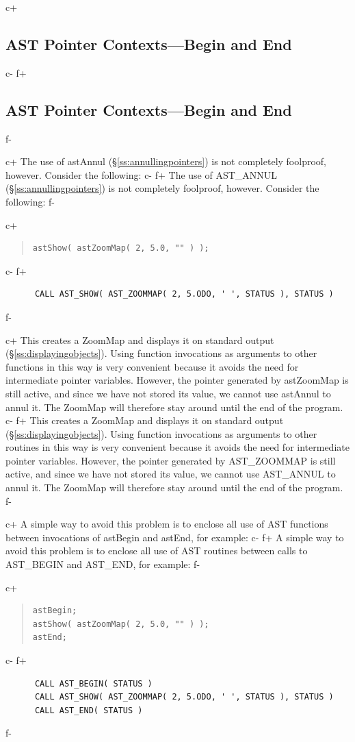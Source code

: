 \documentclass[twoside,11pt]{article}
\newcommand{\secref}[1]{\S\ref{#1}}
\newcommand{\secref}[1]{\ref{#1}}
\begin{document}
c+
\subsection{\label{ss:contexts}AST Pointer Contexts---Begin and End}
c-
f+
\subsection{\label{ss:contexts}AST Pointer Contexts---Begin and End}
f-

c+
The use of astAnnul (\secref{ss:annullingpointers}) is not completely
foolproof, however. Consider the following:
c-
f+
The use of AST\_ANNUL (\secref{ss:annullingpointers}) is not completely
foolproof, however. Consider the following:
f-

c+
\begin{quote}
\small
\begin{verbatim}
astShow( astZoomMap( 2, 5.0, "" ) );
\end{verbatim}
\normalsize
\end{quote}
c-
f+
\small
\begin{verbatim}
      CALL AST_SHOW( AST_ZOOMMAP( 2, 5.ODO, ' ', STATUS ), STATUS )
\end{verbatim}
\normalsize
f-

c+
This creates a ZoomMap and displays it on standard output
(\secref{ss:displayingobjects}). Using function invocations as
arguments to other functions in this way is very convenient because it
avoids the need for intermediate pointer variables. However, the
pointer generated by astZoomMap is still active, and since we have not
stored its value, we cannot use astAnnul to annul it. The ZoomMap will
therefore stay around until the end of the program.
c-
f+
This creates a ZoomMap and displays it on standard output
(\secref{ss:displayingobjects}). Using function invocations as
arguments to other routines in this way is very convenient because it
avoids the need for intermediate pointer variables. However, the
pointer generated by AST\_ZOOMMAP is still active, and since we have
not stored its value, we cannot use AST\_ANNUL to annul it. The
ZoomMap will therefore stay around until the end of the program.
f-

c+
A simple way to avoid this problem is to enclose all use of AST
functions between invocations of astBegin and astEnd, for example:
c-
f+
A simple way to avoid this problem is to enclose all use of AST
routines between calls to AST\_BEGIN and AST\_END, for example:
f-

c+
\begin{quote}
\small
\begin{verbatim}
astBegin;
astShow( astZoomMap( 2, 5.0, "" ) );
astEnd;
\end{verbatim}
\normalsize
\end{quote}
c-
f+
\small
\begin{verbatim}
      CALL AST_BEGIN( STATUS )
      CALL AST_SHOW( AST_ZOOMMAP( 2, 5.ODO, ' ', STATUS ), STATUS )
      CALL AST_END( STATUS )
\end{verbatim}
\normalsize
f-
\end{document}
